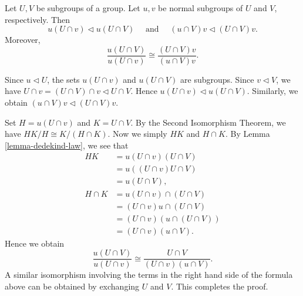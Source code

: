 \begin{lemma} \label{lemma-zassenhaus}
	Let $U,V$ be subgroups of a group. Let $u,v$ be normal subgroups of $U$ and $V$, respectively. Then 
	\begin{equation*}
		u(U\cap v)\lhd u(U\cap V) \quad \text{ and }\quad (u\cap V)v \lhd (U\cap V)v.
	\end{equation*}
	Moreover, 
	\begin{equation*}
		\frac{u(U\cap V)}{u(U\cap v)} \cong \frac{(U\cap V)v}{(u\cap V)v}.
	\end{equation*}
\end{lemma}
\begin{sketch}
		
	
	
	Since $u \lhd U$, the sets $u(U\cap v)$ and $u(U\cap V)$ are subgroups. Since $v\lhd V$, we have $U\cap v = (U\cap V) \cap v\lhd U\cap V$. Hence $u(U\cap v)\lhd u(U\cap V)$. Similarly, we obtain $(u\cap V)v \lhd (U\cap V)v$.
	
Set $H = u(U\cap v)$ and $K = U \cap V$. By the Second Isomorphism Theorem, we have $HK/H \cong  K/(H\cap K)$. Now we simply $HK$ and $H\cap K$. By Lemma \ref{lemma-dedekind-law}, we see that
\begin{align*}
	HK &= u(U\cap v) (U \cap V)
	\\
	&= u((U\cap v)U \cap V)
	\\
	&= u(U\cap V),
	\\
	H \cap K  &= u(U\cap v) \cap (U \cap V)\\
	&=  (U\cap v)u \cap (U \cap V)
	\\
	&= (U\cap v)(u \cap (U\cap V))
	\\
	&= (U \cap v)(u \cap V).
\end{align*}
Hence we obtain
\begin{equation*}
	\frac{u(U\cap V)}{u(U\cap v)}\cong \frac{U\cap V}{(U\cap v)(u\cap V)}.
\end{equation*}
A similar isomorphism involving the terms in the right hand side of the formula above can be obtained by exchanging $U$ and $V$. This completes the proof.
\end{sketch}
